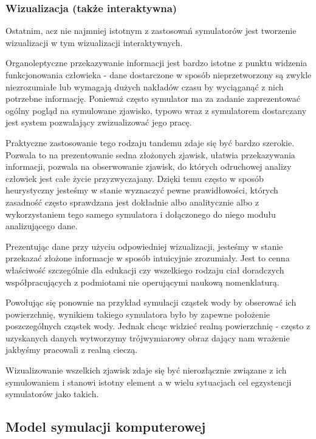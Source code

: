 \subsubsection{Wizualizacja (także interaktywna)}
\par{
Ostatnim, acz nie najmniej istotnym z zastosowań symulatorów jest tworzenie wizualizacji w tym wizualizacji interaktywnych.
}
\par{
Organoleptyczne przekazywanie informacji jest bardzo istotne z punktu widzenia funkcjonowania człowieka - dane dostarczone w sposób nieprzetworzony są zwykle niezrozumiałe lub wymagają dużych nakładów czasu by wyciąganąć z nich potrzebne informację. Ponieważ często symulator ma za zadanie zaprezentować ogólny pogląd na symulowane zjawisko, typowo wraz z symulatorem dostarczany jest system pozwalający zwizualizować jego pracę.
}
\par{
Praktyczne zastosowanie tego rodzaju tandemu zdaje się być bardzo szerokie. Pozwala to na prezentowanie sedna złożonych zjawisk, ułatwia przekazywania informacji, pozwala na obserwowanie zjawisk, do których odruchowej analizy człowiek jest całe życie przyzwyczajany. Dzięki temu często w sposób heurystyczny jesteśmy w stanie wyznaczyć pewne prawidłowości, których zasadność często sprawdzana jest dokładnie albo analitycznie albo z wykorzystaniem tego samego symulatora i dołączonego do niego modułu analizującego dane.
}
\par{
Prezentując dane przy użyciu odpowiedniej wizualizacji, jesteśmy w stanie przekazać złożone informacje w sposób intuicyjnie zrozumiały. Jest to cenna właściwość szczególnie dla edukacji czy wszelkiego rodzaju ciał doradczych współpracujących z podmiotami nie operującymi naukową nomenklaturą.
}
\par{
Powołując się ponownie na przykład symulacji cząstek wody by obserować ich powierzchnię, wynikiem takiego symulatora było by zapewne położenie poszczególnych cząstek wody. Jednak chcąc widzieć realną powierzchnię - często z uzyskanych danych wytworzymy trójwymiarowy obraz dający nam wrażenie jakbyśmy pracowali z realną cieczą.
}
\par{
Wizualizowanie wszelkich zjawisk zdaje się być nierozłącznie związane z ich symulowaniem i stanowi istotny element a w wielu sytuacjach cel egzystencji symulatorów jako takich.
}

\subsection{Model symulacji komputerowej}

